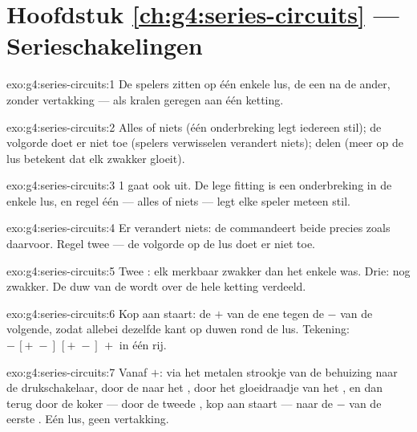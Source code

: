 \section*{Hoofdstuk \ref{ch:g4:series-circuits} --- Serieschakelingen}

\begin{solution}{exo:g4:series-circuits:1}
De spelers zitten op één enkele lus, de een na de ander, zonder
vertakking --- als kralen geregen aan één ketting.
\end{solution}

\begin{solution}{exo:g4:series-circuits:2}
Alles of niets (één onderbreking legt iedereen stil); de volgorde doet
er niet toe (spelers verwisselen verandert niets); delen (meer
 op de lus betekent dat elk zwakker gloeit).
\end{solution}

\begin{solution}{exo:g4:series-circuits:3}
 1 gaat ook uit. De lege fitting is een onderbreking in de
enkele lus, en regel één --- alles of niets --- legt elke speler
meteen stil.
\end{solution}

\begin{solution}{exo:g4:series-circuits:4}
Er verandert niets: de  commandeert beide  precies
zoals daarvoor. Regel twee --- de volgorde op de lus doet er niet toe.
\end{solution}

\begin{solution}{exo:g4:series-circuits:5}
Twee : elk merkbaar zwakker dan het enkele  was. Drie:
nog zwakker. De duw van de  wordt over de hele ketting
verdeeld.
\end{solution}

\begin{solution}{exo:g4:series-circuits:6}
Kop aan staart: de $+$ van de ene tegen de $-$ van de volgende, zodat
allebei dezelfde kant op duwen rond de lus. Tekening:
$-\,[{+}\;{-}]\,[{+}\;{-}]\,+$ in één rij.
\end{solution}

\begin{solution}{exo:g4:series-circuits:7}
Vanaf $+$: via het metalen strookje van de behuizing naar de
drukschakelaar, door de  naar het , door het
gloeidraadje van het , en dan terug door de koker --- door de
tweede , kop aan staart --- naar de $-$ van de eerste
. Eén lus, geen vertakking.
\end{solution}

